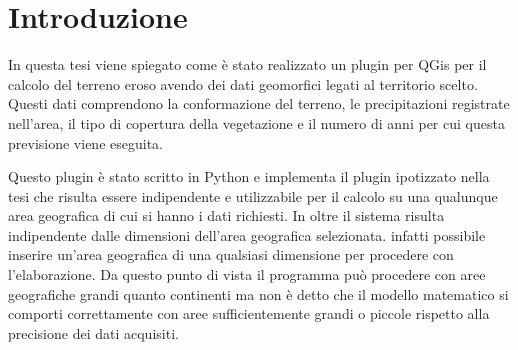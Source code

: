 
\cleardoublepage
{}

\chapter*{Introduzione}

In questa tesi viene spiegato come è stato realizzato un plugin per QGis per il calcolo del terreno eroso avendo dei dati geomorfici legati al territorio scelto. Questi dati comprendono la conformazione del terreno, le precipitazioni registrate nell'area, il tipo di copertura della vegetazione e il numero di anni per cui questa previsione viene eseguita.

Questo plugin è stato scritto in Python e implementa il plugin ipotizzato nella tesi \cite{tesi:ambientale} che risulta essere indipendente e utilizzabile per il calcolo su una qualunque area geografica di cui si hanno i dati richiesti. In oltre il sistema risulta indipendente dalle dimensioni dell'area geografica selezionata. \egrave infatti possibile inserire un'area geografica di una qualsiasi dimensione per procedere con l'elaborazione. Da questo punto di vista il programma può procedere con aree geografiche grandi quanto continenti ma non è detto che il modello matematico si comporti correttamente con aree sufficientemente grandi o piccole rispetto alla precisione dei dati acquisiti.